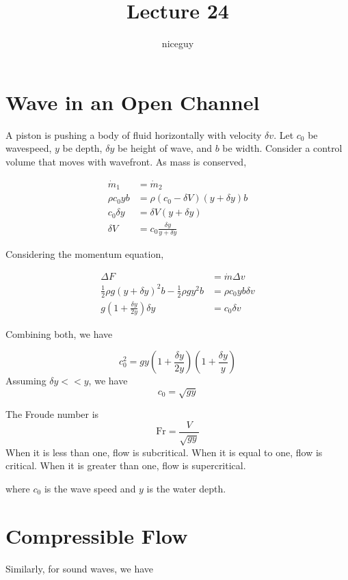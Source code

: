 \documentclass[12pt]{article}
\author{niceguy}
\title{Lecture 24}
\begin{document}
\maketitle

\section{Wave in an Open Channel}

A piston is pushing a body of fluid horizontally with velocity $\delta v$. Let $c_0$ be wavespeed, $y$ be depth, $\delta y$ be height of wave, and $b$ be width. Consider a control volume that moves with wavefront. As mass is conserved,

\begin{align*}
	\dot{m}_1 &= \dot{m}_2 \\
	\rho c_0 yb &= \rho(c_0-\delta V)(y+\delta y)b \\
	c_0\delta y &= \delta V(y + \delta y) \\
	\delta V &= c_0\frac{\delta y}{y + \delta y}
\end{align*}

Considering the momentum equation,

\begin{align*}
	\Delta F &= \dot{m}\Delta v \\
	\frac{1}{2}\rho g(y+\delta y)^2b - \frac{1}{2}\rho gy^2b &= \rho c_0yb\delta v \\
		g(1 + \frac{\delta y}{2y})\delta y &= c_0\delta v
\end{align*}

Combining both, we have

$$c_0^2 = gy(1+\frac{\delta y}{2y})(1+\frac{\delta y}{y})$$
Assuming $\delta y << y$, we have
$$c_0 = \sqrt{gy}$$

\begin{defn}
	The Froude number is
	$$\mathrm{Fr} = \frac{V}{\sqrt{gy}}$$
	When it is less than one, flow is subcritical. When it is equal to one, flow is critical. When it is greater than one, flow is supercritical.
\end{defn}

where $c_0$ is the wave speed and $y$ is the water depth.

\section{Compressible Flow}

Similarly, for sound waves, we have
\end{document}
